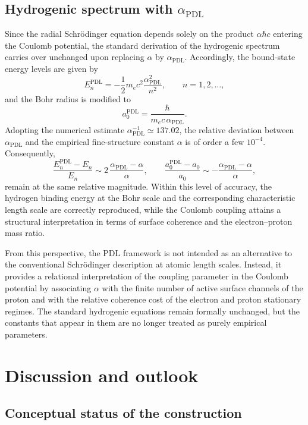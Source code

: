 \documentclass[12pt,a4paper]{article}
\begin{document}
\subsection{Hydrogenic spectrum with \texorpdfstring{\(\alpha_{\text{PDL}}\)}{alpha\_PDL}}

Since the radial Schrödinger equation depends solely on the product \(\alpha \hbar c\) entering the Coulomb potential, the standard derivation of the hydrogenic spectrum carries over unchanged upon replacing \(\alpha\) by \(\alpha_{\text{PDL}}\).
Accordingly, the bound-state energy levels are given by
\[
  E_n^{\text{PDL}}
  =
  -\frac{1}{2} m_e c^2 \frac{\alpha_{\text{PDL}}^2}{n^2},
  \qquad
  n = 1,2,\dots,
\]
and the Bohr radius is modified to
\[
  a_0^{\text{PDL}}
  =
  \frac{\hbar}{m_e c\,\alpha_{\text{PDL}}}.
\]
Adopting the numerical estimate \(\alpha_{\text{PDL}}^{-1}\simeq 137.02\), the relative deviation between \(\alpha_{\text{PDL}}\) and the empirical fine-structure constant \(\alpha\) is of order a few \(10^{-4}\). Consequently,
\[
  \frac{E_n^{\text{PDL}} - E_n}{E_n}
  \sim
  2\,\frac{\alpha_{\text{PDL}} - \alpha}{\alpha},
  \qquad
  \frac{a_0^{\text{PDL}} - a_0}{a_0}
  \sim
  -\frac{\alpha_{\text{PDL}} - \alpha}{\alpha},
\]
remain at the same relative magnitude.
Within this level of accuracy, the hydrogen binding energy at the Bohr scale and the corresponding characteristic length scale are correctly reproduced, while the Coulomb coupling attains a structural interpretation in terms of surface coherence and the electron–proton mass ratio.\cite{Laubscher2026PDL_English,Laubscher2026LDP_French}

From this perspective, the PDL framework is not intended as an alternative to the conventional Schrödinger description at atomic length scales.
Instead, it provides a relational interpretation of the coupling parameter in the Coulomb potential by associating \(\alpha\) with the finite number of active surface channels of the proton and with the relative coherence cost of the electron and proton stationary regimes.
The standard hydrogenic equations remain formally unchanged, but the constants that appear in them are no longer treated as purely empirical parameters.

\section{Discussion and outlook}

\subsection{Conceptual status of the construction}
\end{document}
